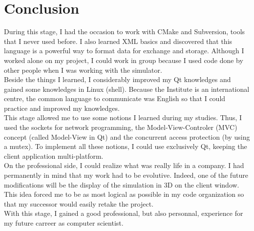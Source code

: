 \chapter{Conclusion}

During this stage, I had the occasion to work with CMake and Subversion, tools
that I never used before. I also learned XML basics and discovered that this
language is a powerful way to format data for exchange and storage. Although I
worked alone on my project, I could work in group because I used code done by
other people when I was working with the simulator. \\

Beside the things I learned, I considerably improved my Qt knowledges and
gained some knowledges in Linux (shell). Because the Institute is an
international centre, the common language to communicate was English so that I
could practice and improved my knowledges.\\

This stage allowed me to use some notions I learned during my studies. Thus, I
used the sockets for network programming, the Model-View-Controler (MVC)
concept (called Model-View in Qt) and the concurrent access protection (by using
a mutex). To implement all these notions, I could use exclusively Qt, keeping
the client application multi-platform.\\

On the professional side, I could realize what was really life in a company. I
had permanently in mind that my work had to be evolutive. Indeed, one of the
future modifications will be the display of the simulation in 3D on the client
window. This idea forced me to be as most logical as possible in my code
organization so that my successor would easily retake the project.\\

With this stage, I gained a good professional, but also personnal, experience
for my future carreer as computer scientist.

